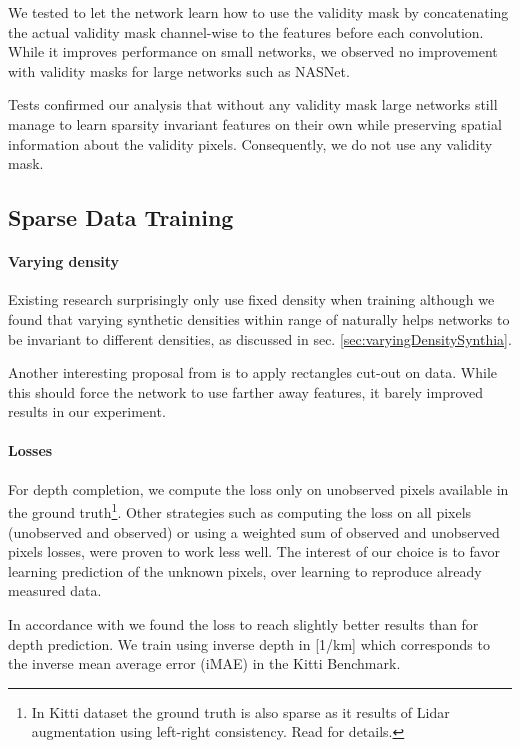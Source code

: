\documentclass[10pt,twocolumn,letterpaper]{article}
\begin{document}
We tested to let the network learn how to use the validity mask by concatenating the actual validity mask channel-wise to the features before each convolution.
While it improves performance on small networks, we observed no improvement with validity masks for large networks such as NASNet.

Tests confirmed our analysis that without any validity mask large networks still manage to learn sparsity invariant features on their own while preserving spatial
information about the validity pixels. 
Consequently, we do not use any validity mask.


\subsection{Sparse Data Training}
\label{sec:sparse-training}

\paragraph{Varying density}

Existing research surprisingly only use fixed density when training although we found that varying synthetic densities within range of  naturally helps networks to be invariant to different densities, as discussed in sec. \ref{sec:varyingDensitySynthia}.

Another interesting proposal from \cite{devries2017improved} is to apply rectangles cut-out on data. While this should force the network to use farther away features, it barely improved results in our experiment.


\paragraph{Losses}
For depth completion, we compute the loss only on unobserved pixels available in the ground truth\footnote{In Kitti dataset the ground truth is also sparse as it results of Lidar augmentation using left-right consistency. Read \cite{uhrig2017sparsity} for details.}.
Other strategies such as computing the loss on all pixels (unobserved and observed) or using a weighted sum of observed and unobserved pixels losses, were proven to work less well.
The interest of our choice is to favor learning prediction of the unknown pixels, over learning to reproduce already measured data.

In accordance with \cite{uhrig2017sparsity} we found the  loss to reach slightly better results than  for depth prediction.
We train using inverse depth in [1/km] which corresponds to the inverse mean average error (iMAE) in the Kitti Benchmark.
\end{document}
